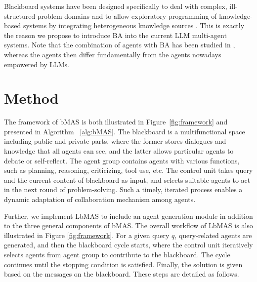 \documentclass[11pt]{article}
\begin{document}
Blackboard systems have been designed specifically to deal with complex, ill-structured problem domains and to allow exploratory programming of knowledge-based systems by integrating heterogeneous knowledge sources \citep{cavazza2001blackboard}. This is exactly the reason we propose to introduce BA into the current LLM multi-agent systems. Note that the combination of agents with BA has been studied in \citep{1684906,article,1425173}, whereas the agents then differ fundamentally from the agents nowadays empowered by LLMs. 


\section{Method}

The framework of bMAS is both illustrated in Figure~\ref{fig:framework} and presented in Algorithm ~\ref{alg:bMAS}. The blackboard is a multifunctional space including public and private parts, where the former stores dialogues and knowledge that all agents can see, and the latter allows particular agents to debate or self-reflect. The agent group contains agents with various functions, such as planning, reasoning, criticizing, tool use, etc. The control unit takes query and the current content of blackboard as input, and selects suitable agents to act in the next round of problem-solving. Such a timely, iterated process enables a dynamic adaptation of collaboration mechanism among agents. 

Further, we implement LbMAS to include an agent generation module in addition to the three general components of bMAS. The overall workflow of LbMAS is also illustrated in Figure \ref{fig:framework}. For a given query $q$, query-related agents are generated, and then the blackboard cycle starts, where the control unit iteratively selects agents from agent group to contribute to the blackboard. The cycle continues until the stopping condition is satisfied. Finally, the solution is given based on the messages on the blackboard. These steps are detailed as follows. 
\end{document}
